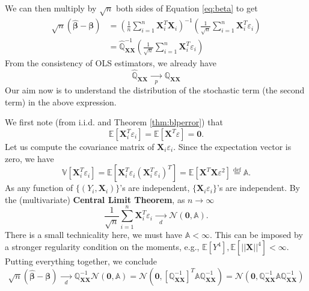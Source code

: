 \documentclass[
]{book}
\theoremstyle{definition}
\theoremstyle{definition}
\theoremstyle{definition}
\theoremstyle{definition}
\theoremstyle{remark}
\begin{document}
We can then multiply by \(\sqrt{n}\) both sides of Equation \eqref{eq:beta} to get
\[
\begin{aligned}
\sqrt{n}\left(\widehat{{\boldsymbol{\beta}}}-{\boldsymbol{\beta}}\right)
&=\left( \frac{1}{n}\sum\limits_{i=1}^n{\boldsymbol{X}}_i^T{\boldsymbol{X}}_i \right)^{-1}
\left( \frac{1}{\sqrt{n}}\sum\limits_{i=1}^n{\boldsymbol{X}}_i^T\varepsilon_i \right) \\
&=\widehat{{\mathbb{Q}}}_{{\boldsymbol{XX}}}^{-1}
\left( \frac{1}{\sqrt{n}}\sum\limits_{i=1}^n{\boldsymbol{X}}_i^T\varepsilon_i \right)
\end{aligned}
\]
From the consistency of OLS estimators, we already have
\[ \widehat{{\mathbb{Q}}}_{{\boldsymbol{XX}}}\xrightarrow[p]{\quad\quad}{\mathbb{Q}}_{{\boldsymbol{XX}}}\]
Our aim now is to understand the distribution of the stochastic term (the second term) in the above expression.

We first note (from i.i.d. and Theorem \ref{thm:blperror}) that
\[
{\mathbb{E}\left[ {\boldsymbol{X}}_i^T\varepsilon_i \right]}={\mathbb{E}\left[ {\boldsymbol{X}}^T\varepsilon \right]}={\boldsymbol{0}}.
\]
Let us compute the covariance matrix of \({\boldsymbol{X}}_i\varepsilon_i\). Since the expectation vector is zero, we have
\[
{\mathbb{V}}[{\boldsymbol{X}}_i^T\varepsilon_i]={\mathbb{E}\left[ {\boldsymbol{X}}_i^T\varepsilon_i\left({\boldsymbol{X}}_i^T\varepsilon_i\right)^T \right]}={\mathbb{E}\left[ {\boldsymbol{X}}^T{\boldsymbol{X}}\varepsilon^2 \right]}\stackrel{\text{def}}{=}{\mathbb{A}}.
\]
As any function of \(\{(Y_i,{\boldsymbol{X}}_i)\}\)'s are independent, \(\{{\boldsymbol{X}}_i\varepsilon_i\}\)'s are independent. By the (multivariate) \textbf{Central Limit Theorem}, as \(n\to\infty\)
\[
\frac{1}{\sqrt{n}}\sum\limits_{i=1}^n{\boldsymbol{X}}_i^T\varepsilon_i
\xrightarrow[d]{\quad\quad}\mathcal{N}({\boldsymbol{0}},{\mathbb{A}}).
\]
There is a small technicality here, we must have \({\mathbb{A}}<\infty\). This can be imposed by a stronger regularity condition on the moments, e.g.,
\({\mathbb{E}\left[ Y^4 \right]},{\mathbb{E}\left[ ||{\boldsymbol{X}}||^4 \right]}<\infty\).
Putting everything together, we conclude
\[
\sqrt{n}(\widehat{{\boldsymbol{\beta}}}-{\boldsymbol{\beta}})\xrightarrow[d]{\quad\quad}
{\mathbb{Q}}_{{\boldsymbol{XX}}}^{-1}\mathcal{N}({\boldsymbol{0}},{\mathbb{A}})
=\mathcal{N}\left({\boldsymbol{0}},\left[{\mathbb{Q}}_{{\boldsymbol{XX}}}^{-1}\right]^T{\mathbb{A}}{\mathbb{Q}}_{{\boldsymbol{XX}}}^{-1}\right)
=\mathcal{N}\left({\boldsymbol{0}},{\mathbb{Q}}_{{\boldsymbol{XX}}}^{-1}{\mathbb{A}}{\mathbb{Q}}_{{\boldsymbol{XX}}}^{-1}\right)
\]
\end{document}
